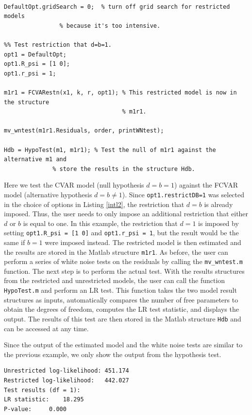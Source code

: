 \documentclass[10pt]{article}
\begin{document}
\begin{lstlisting}[frame=single,caption={Hypothesis $\mathscr{H}_d^1$}, label = Hdb1]
%% --------- IMPOSE RESTRICTIONS AND TEST THEM ---------- %

DefaultOpt.gridSearch = 0;	% turn off grid search for restricted models
				% because it's too intensive.

%% Test restriction that d=b=1.
opt1 = DefaultOpt;
opt1.R_psi = [1 0];
opt1.r_psi = 1;

m1r1 = FCVARestn(x1, k, r, opt1); % This restricted model is now in the structure 
                                  % m1r1.

mv_wntest(m1r1.Residuals, order, printWNtest);

Hdb = HypoTest(m1, m1r1); % Test the null of m1r1 against the alternative m1 and
			  % store the results in the structure Hdb.
\end{lstlisting}

Here we test the CVAR model (null hypothesis $d=b=1$) against the FCVAR model (alternative hypothesis $d=b\ne 1$). Since \verb|opt1.restrictDB=1| was selected in the choice of options in Listing \ref{intl2}, the restriction that $d=b$ is already imposed. Thus, the user needs to only impose an additional restriction that either $d$ or $b$ is equal to one. In this example, the restriction that $d=1$ is imposed by setting \verb|opt1.R_psi = [1 0]| and \verb|opt1.r_psi = 1|, but the result would be the same if $b=1$ were imposed instead. The restricted model is then estimated and the results are stored in the Matlab structure \verb|m1r1|. As before, the user can perform a series of white noise tests on the residuals by calling the \verb|mv_wntest.m| function. The next step is to perform the actual test. With the results structures from the restricted and unrestricted models, the user can call the function \verb|HypoTest.m| and perform an LR test. This function takes the two model result structures as inputs, automatically compares the number of free parameters to obtain the degrees of freedom, computes the LR test statistic, and displays the output. The results of this test are then stored in the Matlab structure \verb|Hdb| and can be accessed at any time.

Since the output of the estimated model and the white noise tests are similar to the previous example, we only show the output from the hypothesis test. 

\begin{verbatim}
Unrestricted log-likelihood: 451.174
Restricted log-likelihood:   442.027
Test results (df = 1):
LR statistic: 	 18.295
P-value: 	 0.000
\end{verbatim}
\end{document}
